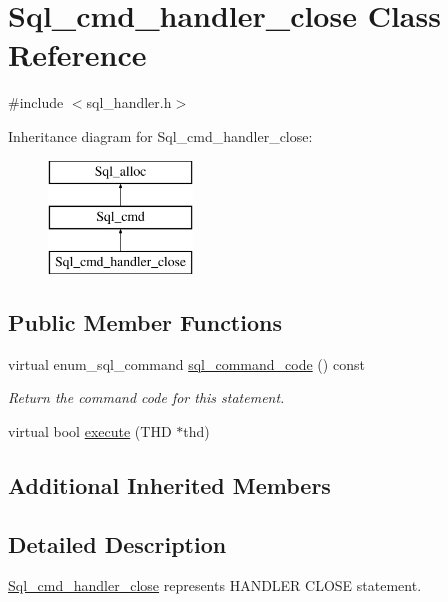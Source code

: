 \hypertarget{classSql__cmd__handler__close}{}\section{Sql\+\_\+cmd\+\_\+handler\+\_\+close Class Reference}
\label{classSql__cmd__handler__close}


{\ttfamily \#include $<$sql\+\_\+handler.\+h$>$}

Inheritance diagram for Sql\+\_\+cmd\+\_\+handler\+\_\+close\+:\begin{figure}[H]
\begin{center}
\leavevmode
\includegraphics[height=3.000000cm]{classSql__cmd__handler__close}
\end{center}
\end{figure}
\subsection*{Public Member Functions}
\begin{DoxyCompactItemize}
\item 
\mbox{\label{classSql__cmd__handler__close_a0a27576bed846bba7ae31135962d48cc}} 
virtual enum\+\_\+sql\+\_\+command \mbox{\hyperlink{classSql__cmd__handler__close_a0a27576bed846bba7ae31135962d48cc}{sql\+\_\+command\+\_\+code}} () const
\begin{DoxyCompactList}\small\item\em Return the command code for this statement. \end{DoxyCompactList}\item 
virtual bool \mbox{\hyperlink{classSql__cmd__handler__close_a42c36537c4cdb865a98dd73aaa50e209}{execute}} (T\+HD $\ast$thd)
\end{DoxyCompactItemize}
\subsection*{Additional Inherited Members}


\subsection{Detailed Description}
\mbox{\hyperlink{classSql__cmd__handler__close}{Sql\+\_\+cmd\+\_\+handler\+\_\+close}} represents H\+A\+N\+D\+L\+ER C\+L\+O\+SE statement.

